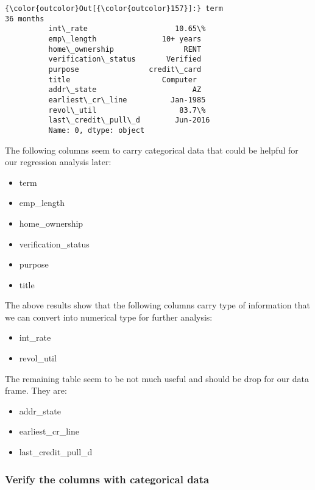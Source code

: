 \documentclass[11pt]{article}
\providecommand{\tightlist}{%
      \setlength{\itemsep}{0pt}\setlength{\parskip}{0pt}}
\begin{document}
\begin{Verbatim}[commandchars=\\\{\}]
{\color{outcolor}Out[{\color{outcolor}157}]:} term                     36 months
          int\_rate                    10.65\%
          emp\_length               10+ years
          home\_ownership                RENT
          verification\_status       Verified
          purpose                credit\_card
          title                     Computer
          addr\_state                      AZ
          earliest\_cr\_line          Jan-1985
          revol\_util                   83.7\%
          last\_credit\_pull\_d        Jun-2016
          Name: 0, dtype: object
\end{Verbatim}
            
    The following columns seem to carry categorical data that could be
helpful for our regression analysis later:

\begin{itemize}
\tightlist
\item
  term
\item
  emp\_length
\item
  home\_ownership
\item
  verification\_status
\item
  purpose
\item
  title
\end{itemize}

The above results show that the following columns carry type of
information that we can convert into numerical type for further
analysis:

\begin{itemize}
\tightlist
\item
  int\_rate
\item
  revol\_util
\end{itemize}

The remaining table seem to be not much useful and should be drop for
our data frame. They are:

\begin{itemize}
\tightlist
\item
  addr\_state
\item
  earliest\_cr\_line
\item
  last\_credit\_pull\_d
\end{itemize}

    \subsubsection{Verify the columns with categorical
data}\label{verify-the-columns-with-categorical-data}
\end{document}
